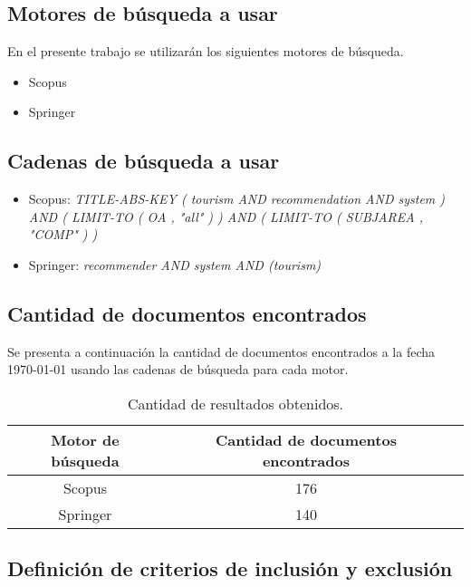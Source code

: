 \subsection{Motores de búsqueda a usar}

En el presente trabajo se utilizarán los siguientes motores de búsqueda.

\begin{itemize}
    \item{Scopus}
    \item{Springer}
\end{itemize}

\subsection{Cadenas de búsqueda a usar}

\begin{itemize}
    \item{Scopus: \emph{TITLE-ABS-KEY ( tourism  AND recommendation  AND system )  AND  (  LIMIT-TO ( OA ,  "all" ) )  AND  ( LIMIT-TO ( SUBJAREA ,  "COMP" ) ) }}
    \item{Springer: \emph{recommender AND system AND (tourism)}}
\end{itemize}

\subsection{Cantidad de documentos encontrados}

Se presenta a continuación la cantidad de documentos encontrados a la fecha \today{}
usando las cadenas de búsqueda para cada motor.

\begin{table}[h!]
    \centering
    \begin{tabular}{c  c  c}
        \toprule
        Motor de búsqueda & Cantidad de documentos encontrados\\
        \midrule
        Scopus & 176\\
        \midrule
        Springer & 140\\
        \bottomrule
    \end{tabular}
    \caption{Cantidad de resultados obtenidos.}\label{table:cantidad_datos}
\end{table}

\subsection{Definición de criterios de inclusión y exclusión}

